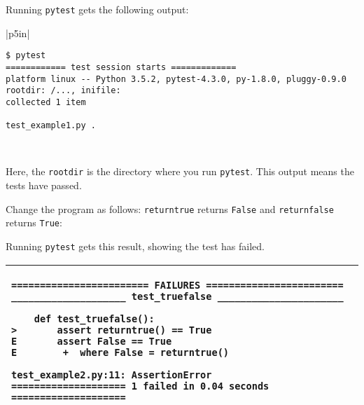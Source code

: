 \resetlinenumber[1]
\linenumbers
\begin{tt}
  
\end{tt}
\nolinenumbers

Running {\tt pytest} gets the following output:

\vspace{0.2in}

\noindent
\begin{tabular}{|p{5in}|}\hline
\begin{verbatim}
$ pytest
============ test session starts =============
platform linux -- Python 3.5.2, pytest-4.3.0, py-1.8.0, pluggy-0.9.0
rootdir: /..., inifile:
collected 1 item

test_example1.py .                                
\end{verbatim}
\\ \hline
\end{tabular}
\vspace{0.2in}

Here, the {\tt rootdir} is the directory where you run {\tt pytest}.
This output means the tests have passed.

Change the program  as follows: {\tt returntrue} returns {\tt False}
and {\tt returnfalse} returns {\tt True}:

\resetlinenumber[1]
\linenumbers
\begin{tt}
  
\end{tt}
\nolinenumbers

Running {\tt pytest} gets this result, showing the test has failed.


\vspace{0.2in}

\noindent
\begin{tabular}{|p{5in}|}\hline
\begin{verbatim}
======================== FAILURES ========================
____________________ test_truefalse ______________________

    def test_truefalse():
>       assert returntrue() == True
E       assert False == True
E        +  where False = returntrue()

test_example2.py:11: AssertionError
==================== 1 failed in 0.04 seconds ====================
\end{verbatim}
\\ \hline
\end{tabular}
\vspace{0.2in}

